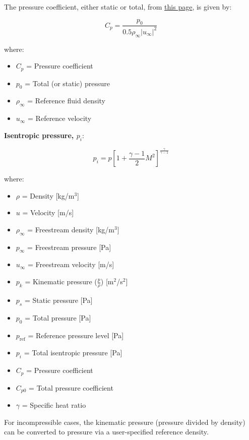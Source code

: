 \documentclass[12pt]{article}
\begin{document}
The pressure coefficient, either static or total, from \href{https://www.openfoam.com/documentation/guides/latest/doc/guide-fos-field-pressure.html}{this page}, is given by:

\begin{equation}
C_p = \frac{p_0}{0.5 \rho_\infty |u_\infty|^2}
\label{eq:cp}
\end{equation}

where:
\begin{itemize}
    \item $C_p$ = Pressure coefficient
    \item $p_0$ = Total (or static) pressure
    \item $\rho_\infty$ = Reference fluid density
    \item $u_\infty$ = Reference velocity
\end{itemize}

\textbf{Isentropic pressure, $p_i$}:

\begin{equation}
p_i = p \left[1 + \frac{\gamma - 1}{2} M^2 \right]^{\frac{\gamma}{\gamma - 1}}
\label{eq:pi}
\end{equation}

where:

\begin{itemize}
    \item $\rho$ = Density [kg/m$^3$]
    \item $u$ = Velocity [m/s]
    \item $\rho_\infty$ = Freestream density [kg/m$^3$]
    \item $p_\infty$ = Freestream pressure [Pa]
    \item $u_\infty$ = Freestream velocity [m/s]
    \item $p_k$ = Kinematic pressure ($\frac{p}{\rho}$) [m$^2$/s$^2$]
    \item $p_s$ = Static pressure [Pa]
    \item $p_0$ = Total pressure [Pa]
    \item $p_\text{ref}$ = Reference pressure level [Pa]
    \item $p_i$ = Total isentropic pressure [Pa]
    \item $C_p$ = Pressure coefficient
    \item $C_{p0}$ = Total pressure coefficient
    \item $\gamma$ = Specific heat ratio
\end{itemize}

For incompressible cases, the kinematic pressure (pressure divided by density) can be converted to pressure via a user-specified reference density.
\end{document}

